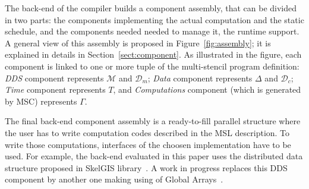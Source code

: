 The back-end of the compiler builds a component assembly, that can be divided in two parts: the components implementing the actual computation and the static schedule, and the components needed needed to manage it, \ie the runtime support. A general view of this assembly is proposed in Figure~\ref{fig:assembly}; it is explained in details in Section~\ref{sect:component}. As illustrated in the figure, each component is linked to one or more tuple of the multi-stencil program definition: \emph{DDS} component represents $\mathcal{M}$ and $\mathcal{D}_m$; \emph{Data} component represents $\Delta$ and $\mathcal{D}_c$; \emph{Time} component represents $T$, and \emph{Computations} component (which is generated by MSC) represents $\Gamma$.

The final back-end component assembly is a ready-to-fill parallel structure where the user has to write computation codes described in the MSL description. To write those computations, interfaces of the choosen implementation have to be used. For example, the back-end evaluated in this paper uses the distributed data structure proposed in SkelGIS library~\cite{CPE:CPE3494}. A work in progress replaces this DDS component by another one making using of Global Arrays~\cite{Nieplocha:2006:AAP:1125980.1125985}.

